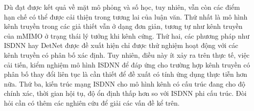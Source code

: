 Dù đạt được kết quả về mặt mô phỏng và số học, tuy nhiên, vẫn còn các điểm hạn chế có thể được cải thiện trong tương lai của luận văn. Thứ nhất là mô hình kênh truyền trong các giả thiết vẫn ở dạng đơn giản, tương tự như kênh truyền của mMIMO ở trạng thái lý tưởng khi kênh cứng. Thứ hai, các phương pháp như ISDNN hay DetNet được đề xuất hiện chỉ được thử nghiệm hoạt động với các kênh truyền có phân bố xác định. Tuy nhiên, điều này ít xảy ra trên thực tế, việc cải tiến, kiểm nghiệm mô hình ISDNN để đáp ứng cho trường hợp kênh truyền có phân bố thay đổi liên tục là cần thiết để đề xuất có tính ứng dụng thực tiễn hơn nữa. Thứ ba, kiến trúc mạng ISDNN cho mô hình kênh có cấu trúc đang cho độ chính xác, thời gian hội tụ, độ ổn định thấp hơn so với ISDNN phi cấu trúc. Đòi hỏi cần có thêm các nghiên cứu để giải các vấn đề kể trên.